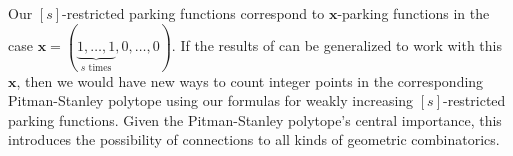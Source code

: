 \documentclass[12 pt]{amsart}
\theoremstyle{definition} %
\theoremstyle{remark} %
\begin{document}
Our $[s]$-restricted parking functions correspond to $\mathbf{x}$-parking functions in the case $\mathbf{x} = (\underbrace{1, \dots, 1}_{s \text{ times}}, 0, \dots, 0)$. If the results of \cite{andres-others-2023} can be generalized to work with this $\mathbf{x}$, then we would have new ways to count integer points in the corresponding Pitman-Stanley polytope using our formulas for weakly increasing $[s]$-restricted parking functions. Given the Pitman-Stanley polytope's central importance, this introduces the possibility of connections to all kinds of geometric combinatorics.



\end{document}
